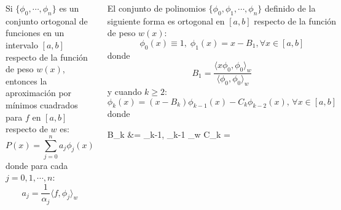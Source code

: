 \documentclass[9pt, aspectratio=169]{beamer}
\begin{document}
\begin{frame}
	\begin{columns}[t]
		\cx
		\begin{theorem}[]
			Si $\{\phi_0, \cdots, \phi_n \}$ es un conjunto ortogonal de funciones en un intervalo $[a, b]$ respecto de la función de peso $w(x)$, entonces la aproximación por mínimos cuadrados para $f$ en $[a, b]$ respecto de $w$ es:
			\[P(x) = \sum_{j=0}^n a_j \phi_j(x) \]
			donde para cada $j = 0, 1, \cdots, n$:
			\[ a_j = \frac{1}{\alpha_j} \langle f, \phi_j \rangle_w \]
		\end{theorem} \pause

		\cx
		\begin{theorem}[]
			El conjunto de polinomios $\{\phi_0, \phi_1, \cdots, \phi_n\}$ definido de la siguiente forma es ortogonal en $[a, b]$ respecto de la función de peso $w(x)$:
			\[ \phi_0(x) \equiv 1, \; \phi_1(x) = x - B_1, \forall x \in [a, b] \]
			donde
			\[ B_1 = \frac{ \langle x \phi_0, \phi_0 \rangle_w} {\langle \phi_0, \phi_0 \rangle_w} \]
			y cuando $k \geq 2$:
			\[ \phi_k(x) = (x - B_k) \phi_{k-1}(x) - C_k \phi_{k-2}(x), \, \forall x \in [a, b] \]
			donde
			\begin{mathcols}
				B_k &=  { \langle \phi_{k-1}, \phi_{k-1} \rangle_w }
				\changecol
				C_k = 
			\end{mathcols}
		\end{theorem}
	\end{columns}
\end{frame}
\end{document}
